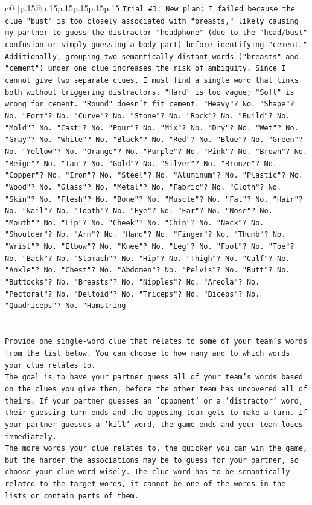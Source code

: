 \documentclass{article}
\begin{document}
{\begin{supertabular}{c@{$\;$}|p{.15\linewidth}@{}p{.15\linewidth}p{.15\linewidth}p{.15\linewidth}p{.15\linewidth}p{.15\linewidth}}
{{{\texttt{Trial \#3: New plan: I failed because the clue "bust" is too closely associated with "breasts," likely causing my partner to guess the distractor "headphone" (due to the "head/bust" confusion or simply guessing a body part) before identifying "cement." Additionally, grouping two semantically distant words ("breasts" and "cement") under one clue increases the risk of ambiguity. Since I cannot give two separate clues, I must find a single word that links both without triggering distractors. "Hard" is too vague; "Soft" is wrong for cement. "Round" doesn't fit cement. "Heavy"? No. "Shape"? No. "Form"? No. "Curve"? No. "Stone"? No. "Rock"? No. "Build"? No. "Mold"? No. "Cast"? No. "Pour"? No. "Mix"? No. "Dry"? No. "Wet"? No. "Gray"? No. "White"? No. "Black"? No. "Red"? No. "Blue"? No. "Green"? No. "Yellow"? No. "Orange"? No. "Purple"? No. "Pink"? No. "Brown"? No. "Beige"? No. "Tan"? No. "Gold"? No. "Silver"? No. "Bronze"? No. "Copper"? No. "Iron"? No. "Steel"? No. "Aluminum"? No. "Plastic"? No. "Wood"? No. "Glass"? No. "Metal"? No. "Fabric"? No. "Cloth"? No. "Skin"? No. "Flesh"? No. "Bone"? No. "Muscle"? No. "Fat"? No. "Hair"? No. "Nail"? No. "Tooth"? No. "Eye"? No. "Ear"? No. "Nose"? No. "Mouth"? No. "Lip"? No. "Cheek"? No. "Chin"? No. "Neck"? No. "Shoulder"? No. "Arm"? No. "Hand"? No. "Finger"? No. "Thumb"? No. "Wrist"? No. "Elbow"? No. "Knee"? No. "Leg"? No. "Foot"? No. "Toe"? No. "Back"? No. "Stomach"? No. "Hip"? No. "Thigh"? No. "Calf"? No. "Ankle"? No. "Chest"? No. "Abdomen"? No. "Pelvis"? No. "Butt"? No. "Buttocks"? No. "Breasts"? No. "Nipples"? No. "Areola"? No. "Pectoral"? No. "Deltoid"? No. "Triceps"? No. "Biceps"? No. "Quadriceps"? No. "Hamstring} \\
\\ 
\\ 
\texttt{Provide one single{-}word clue that relates to some of your team's words from the list below. You can choose to how many and to which words your clue relates to.} \\
\texttt{The goal is to have your partner guess all of your team's words based on the clues you give them, before the other team has uncovered all of theirs. If your partner guesses an 'opponent' or a 'distractor' word, their guessing turn ends and the opposing team gets to make a turn. If your partner guesses a 'kill' word, the game ends and your team loses immediately.} \\
\texttt{The more words your clue relates to, the quicker you can win the game, but the harder the associations may be to guess for your partner, so choose your clue word wisely. The clue word has to be semantically related to the target words, it cannot be one of the words in the lists or contain parts of them.} \\
}}}
\end{supertabular}}
\end{document}
